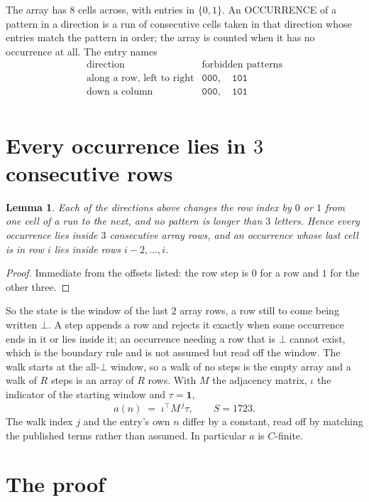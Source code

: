 \documentclass[11pt,a4paper]{article}
\theoremstyle{plain}
\newtheorem{lemma}[theorem]{Lemma}
\theoremstyle{definition}
\begin{document}
The array has $8$ cells across, with entries in $\{0,1\}$. An OCCURRENCE of a pattern in a
direction is a run of consecutive cells taken in that direction whose entries match the pattern
in order; the array is counted when it has no occurrence at all. The entry names
\[
\begin{array}{ll}
\text{direction} & \text{forbidden patterns} \\[2pt]
\text{along a row, left to right} & \mathtt{000},\quad \mathtt{101} \\
\text{down a column} & \mathtt{000},\quad \mathtt{101} \\
\end{array}
\]


\section{Every occurrence lies in $3$ consecutive rows}

\begin{lemma}\label{lem:win}
Each of the directions above changes the row index by $0$ or $1$ from one cell of a run to the
next, and no pattern is longer than $3$ letters. Hence every occurrence lies inside $3$
consecutive array rows, and an occurrence whose last cell is in row $i$ lies inside rows
$i-2,\dots,i$.
\end{lemma}

\begin{proof}
Immediate from the offsets listed: the row step is $0$ for a row and $1$ for the other three.
\end{proof}

So the state is the window of the last $2$ array rows, a row still to come being written
$\bot$. A step appends a row and rejects it exactly when some occurrence ends in it or lies
inside it; an occurrence needing a row that is $\bot$ cannot exist, which is the boundary rule
and is not assumed but read off the window. The walk starts at the all-$\bot$ window, so a walk
of no steps is the empty array and a walk of $R$ steps is an array of $R$ rows. With $M$ the
adjacency matrix, $\iota$ the indicator of the starting window and $\tau=\mathbf{1}$,
\[
a(n)\;=\;\iota^{\!\top}M^{\,j}\tau ,\qquad S=1723.
\]
The walk index $j$ and the entry's own $n$ differ by a constant, read off by matching the
published terms rather than assumed. In particular $a$ is $C$-finite.

\section{The proof}
\end{document}
